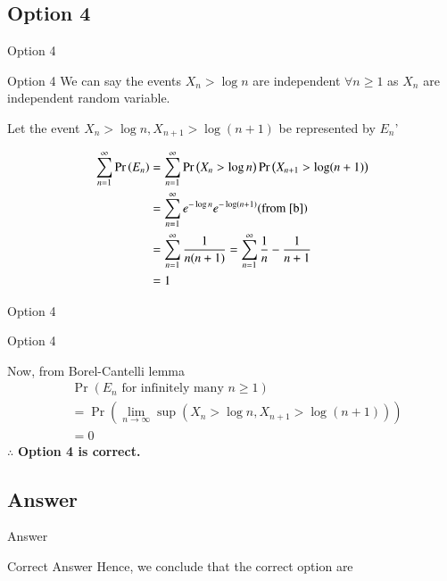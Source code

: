 \documentclass{beamer}
\providecommand{\pr}[1]{\ensuremath{\Pr\left(#1\right)}}
\providecommand{\pr}[1]{\ensuremath{\Pr\left(#1\right)}}
\theoremstyle{remark}
\numberwithin{equation}{subsection}
\begin{document}
\subsection{Option 4}
\begin{frame}{Option 4}
\begin{block}{Option 4}
 We can say the events $X_n>\log n$ are independent $\forall n\geq 1$ as $X_n$ are independent random variable.
    
    Let the event $X_n > \log n,X_{n+1}>\log (n+1)$ be represented by $E_n$'
    
    \begin{align}
        \sum_{n=1}^{\infty}\pr{E_n}
        &= \sum_{n=1}^{\infty}\pr{X_n>\log n}\pr{X_{n+1}>\log (n+1)}\nonumber\\
        &=\sum_{n=1}^{\infty}e^{-\log n}e^{-\log (n+1)}\text{(from \eqref{b})}\nonumber\\
        &=\sum_{n=1}^{\infty}\frac{1}{n(n+1)}=\sum_{n=1}^{\infty}\frac{1}{n}-\frac{1}{n+1}\nonumber\\
        &=1
    \end{align}
    
\end{block}
\end{frame}

\begin{frame}{Option 4}
\begin{block}{Option 4}

    Now, from Borel-Cantelli lemma
    \begin{align}
        &\pr{E_n\text{ for infinitely many }n\geq1}\nonumber\\
        &=\pr{\lim_{n \rightarrow \infty}\sup ( X_n>\log n,X_{n+1}>\log (n+1))}\nonumber\\
        &=0\nonumber
    \end{align}
    $\therefore$ \textbf{Option 4 is correct.}

\end{block}
\end{frame}


\subsection{Answer}

\begin{frame}{Answer}
\begin{block}{Correct Answer}
Hence, we conclude that the correct option are 


\end{block}
   
\end{frame}
\end{document}
